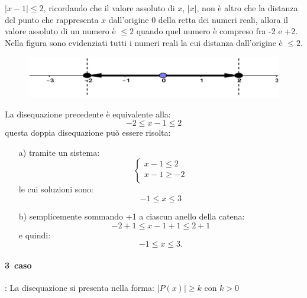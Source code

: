 \begin{esempio}  $|x-1|\leq 2$, ricordando che il valore 
assoluto di $x$, $|x|$, non è altro che la distanza del punto che rappresenta 
$x$ dall'origine 0 della retta dei numeri reali, allora il valore assoluto di 
un 
numero è $\leq 2$ quando quel numero è compreso fra -2 e +2.\\
        Nella figura sono evidenziati tutti i numeri reali la cui distanza 
dall'origine è $\leq 2$.

\begin{figure}[h]
\begin{center}
\begin{inaccessibleblock}[TODO]
\centering
\includegraphics[width=0.7\linewidth]{img/imm4} %
\end{inaccessibleblock}
\label{fig:abs_imm4}
\end{center}
\end{figure}

La disequazione precedente è equivalente alla:
$$-2\leq x-1 \leq 2$$
questa doppia disequazione può essere risolta:
\begin{enumerate}
  \item [a)] tramite un sistema:
    $$
    \left\lbrace 
    \begin{array}{l}
    x-1\leq 2\\
    x-1\geq -2\\
    \end{array}
    \right.
    $$
    le cui soluzioni sono:
    $$-1\leq x \leq 3$$
  \item [b)] semplicemente sommando +1 a ciascun anello della catena:
    $$-2+1\leq x-1+1 \leq 2+1$$
    e quindi:
    $$-1\leq x \leq 3.$$
\end{enumerate}
\end{esempio}

\paragraph{3\textdegree~caso}: La disequazione si presenta nella forma:  
$|P(x)|\geq k$ con $k> 0$\\

